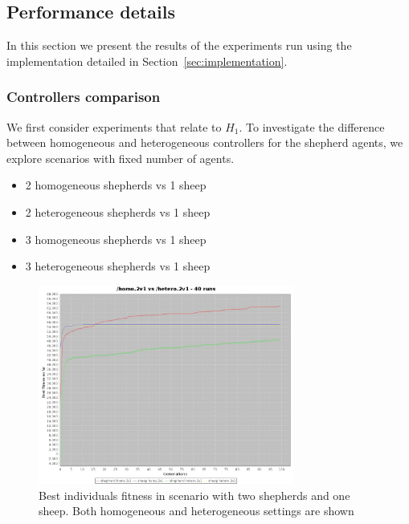 \documentclass[conference]{IEEEtran}
\begin{document}
\subsection{Performance details}
\label{sec:experiments_performances}
In this section we present the results of the experiments run using the implementation detailed in Section~\ref{sec:implementation}.
\vspace{0.5em}
\subsubsection{Controllers comparison}
We first consider experiments that relate to $H_1$. To investigate the difference between homogeneous and heterogeneous controllers for the shepherd agents, we explore scenarios with fixed number of agents. 
\begin{itemize}
	\item 2 homogeneous shepherds vs 1 sheep
	\item 2 heterogeneous shepherds vs 1 sheep
	\item 3 homogeneous shepherds vs 1 sheep
	\item 3 heterogeneous shepherds vs 1 sheep
\end{itemize}

\begin{figure}[ht]
	\centering
	\includegraphics[width=3.3in]{imgs/homo2v1-hetero2v1-bestSoFar.jpeg}
	\caption{Best individuals fitness in scenario with two shepherds and one sheep. Both homogeneous and heterogeneous settings are shown}
	\label{fig:2v1_homo_vs_hetero}
\end{figure}
\end{document}
